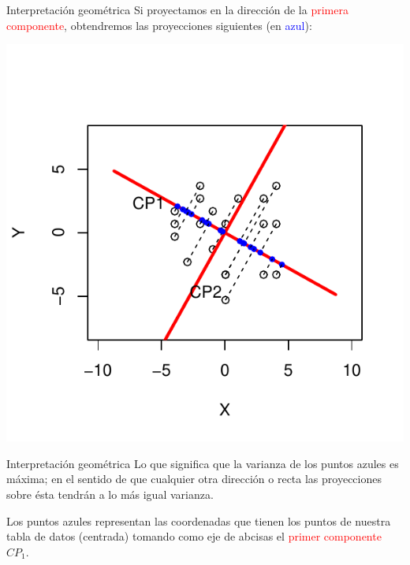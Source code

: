 \documentclass[
  ignorenonframetext,
]{beamer}
\newcommand\blue[1]{\textcolor{blue}{#1}}
\newcommand\red[1]{\textcolor{red}{#1}}
\begin{document}
\begin{frame}{Interpretación geométrica}
\label{interpretaciuxf3n-geomuxe9trica-1}
Si proyectamos en la dirección de la \red{primera componente},
obtendremos las proyecciones siguientes (en \blue{azul}):

\begin{center}\includegraphics{AnalisisComponentesPrincipales_fusion_files/figure-beamer/inter3-1} \end{center}
\end{frame}

\begin{frame}{Interpretación geométrica}
\label{interpretaciuxf3n-geomuxe9trica-2}
Lo que significa que la varianza de los puntos azules es máxima; en el
sentido de que cualquier otra dirección o recta las proyecciones sobre
ésta tendrán a lo más igual varianza. \medskip

Los puntos azules representan las coordenadas que tienen los puntos de
nuestra tabla de datos (centrada) tomando como eje de abcisas el
\red{primer componente} \(CP_1\).
\end{frame}
\end{document}
